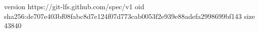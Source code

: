 version https://git-lfs.github.com/spec/v1
oid sha256:de707e403bf08fabc8d7e124f07d773cab0053f2e939e88adefa2998699bf143
size 43840

